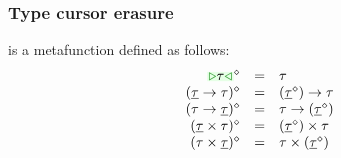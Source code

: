 \documentclass[formalism.tex]{subfiles}
\begin{document}
\subsubsection{Type cursor erasure}
\label{sec:untyped-type-cursor-erasure}
\judgbox{\ensuremath{\cursorErase{\ZTMV}}} is a metafunction defined as follows:
%
\newcommand{\cursorErasesToRow}[2]{\ensuremath{\cursorErase{#1} & = & #2}}
\[\begin{array}{rcl}
  \cursorErasesToRow{\ZTCursor{\TMV}}{\TMV} \\
  \cursorErasesToRow{(\ZTArrowL{\ZTMV}{\TMV})}{\TArrow{(\cursorErase{\ZTMV})}{\TMV}} \\
  \cursorErasesToRow{(\ZTArrowR{\TMV}{\ZTMV})}{\TArrow{\TMV}{(\cursorErase{\ZTMV})}} \\
  \cursorErasesToRow{(\ZTProdL{\ZTMV}{\TMV})}{\TProd{(\cursorErase{\ZTMV})}{\TMV}} \\
  \cursorErasesToRow{(\ZTProdR{\TMV}{\ZTMV})}{\TProd{\TMV}{(\cursorErase{\ZTMV})}} \\
\end{array}\]
\end{document}

